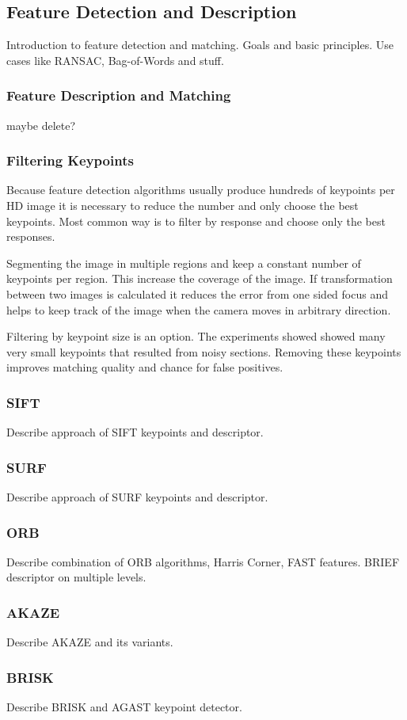 \subsection{Feature Detection and Description}

Introduction to feature detection and matching.
Goals and basic principles.
Use cases like RANSAC, Bag-of-Words and stuff.

\subsubsection{Feature Description and Matching}

maybe delete?

\subsubsection{Filtering Keypoints}

Because feature detection algorithms usually produce hundreds of keypoints per HD image it is necessary to reduce the number and only choose the best keypoints.
Most common way is to filter by response and choose only the best responses.

Segmenting the image in multiple regions and keep a constant number of keypoints per region.
This increase the coverage of the image.
If transformation between two images is calculated it reduces the error from one sided focus and helps to keep track of the image when the camera moves in arbitrary direction.

Filtering by keypoint size is an option. The experiments showed showed many very small keypoints that resulted from noisy sections.
Removing these keypoints improves matching quality and chance for false positives.

\subsubsection{SIFT}

Describe approach of SIFT keypoints and descriptor.

\subsubsection{SURF}

Describe approach of SURF keypoints and descriptor.

\subsubsection{ORB}

Describe combination of ORB algorithms, Harris Corner, FAST features.
BRIEF descriptor on multiple levels.

\subsubsection{AKAZE}

Describe AKAZE and its variants.

\subsubsection{BRISK}

Describe BRISK and AGAST keypoint detector.

